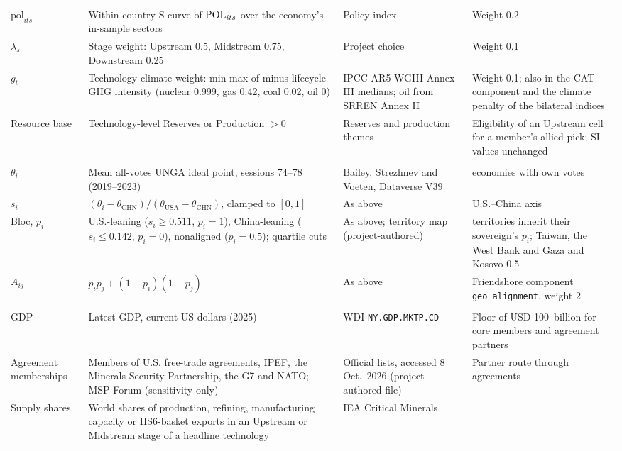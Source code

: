 {\begin{longtable}{@{}>{\raggedright\arraybackslash}p{2.7cm}
  >{\raggedright\arraybackslash}p{5.1cm}
  >{\raggedright\arraybackslash}p{3.1cm}
  >{\raggedright\arraybackslash}p{4.6cm}@{}}
$\mathrm{pol}_{its}$ & Within-country S-curve of $\mathrm{POL}_{its}$ over the economy's in-sample
  sectors & Policy index & Weight 0.2\\
$\lambda_s$ & Stage weight: Upstream 0.5, Midstream 0.75, Downstream 0.25 & Project choice &
  Weight 0.1\\
$g_t$ & Technology climate weight: min-max of minus lifecycle GHG intensity (nuclear 0.999, gas
  0.42, coal 0.02, oil 0) & IPCC AR5 WGIII Annex III medians; oil from SRREN Annex II & Weight
  0.1; also in the CAT component and the climate penalty of the bilateral indices\\
Resource base & Technology-level Reserves or Production $>0$ & Reserves and production themes &
  Eligibility of an Upstream cell for a member's allied pick; SI values unchanged\\
\addlinespace
\multicolumn{4}{@{}l}{\textit{Geopolitical alignment (Section~\ref{sec:coalition})}}\\
$\theta_i$ & Mean all-votes UNGA ideal point, sessions 74--78 (2019--2023) & Bailey, Strezhnev
  and Voeten, Dataverse V39 & 193 economies with own votes\\
$s_i$ & $(\theta_i-\theta_{\mathrm{CHN}})/(\theta_{\mathrm{USA}}-\theta_{\mathrm{CHN}})$,
  clamped to $[0,1]$ & As above & U.S.--China axis\\
Bloc, $p_i$ & U.S.-leaning ($s_i\ge0.511$, $p_i=1$), China-leaning ($s_i\le0.142$, $p_i=0$),
  nonaligned ($p_i=0.5$); quartile cuts & As above; territory map (project-authored) & 44
  territories inherit their sovereign's $p_i$; Taiwan, the West Bank and Gaza and Kosovo 0.5\\
$A_{ij}$ & $p_ip_j+(1-p_i)(1-p_j)$ & As above & Friendshore component
  \texttt{geo\_alignment}, weight 2\\
\addlinespace
\multicolumn{4}{@{}l}{\textit{Coalition rule (Section~\ref{sec:coalition})}}\\
GDP & Latest GDP, current US dollars (2025) & WDI \texttt{NY.GDP.MKTP.CD} & Floor of USD
  100~billion for core members and agreement partners\\
Agreement memberships & Members of U.S. free-trade agreements, IPEF, the Minerals Security
  Partnership, the G7 and NATO; MSP Forum (sensitivity only) & Official lists, accessed 8 Oct.\
  2026 (project-authored file) & Partner route through agreements\\
Supply shares & World shares of production, refining, manufacturing capacity or HS6-basket
  exports in an Upstream or Midstream stage of a headline technology & IEA Critical Minerals

\end{longtable}}
